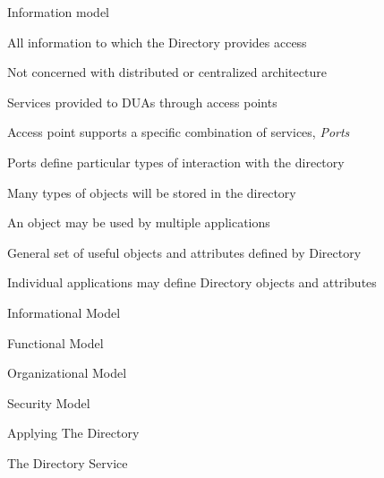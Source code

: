 \begin{bwslide}

\begin{nrtc}
\item	Information model
\item	All information to which the Directory provides access
\item	Not concerned with distributed or centralized architecture
\end{nrtc}
\end{bwslide}

\begin{bwslide}

\begin{nrtc}
\item	Services provided to DUAs through access points
\item	Access point supports a specific combination of services, {\em Ports}
\item	Ports define particular types of interaction with the directory
\end{nrtc}
\end{bwslide}

\begin{bwslide}

\begin{nrtc}
\item	Many types of objects will be stored in the directory
\item	An object may be used by multiple applications
\item	General set of useful objects and attributes defined by Directory
\item	Individual applications may define Directory objects and attributes
\end{nrtc}
\end{bwslide}

\begin{bwslide}

\begin{nrtc}
\item	Informational Model
\item	Functional Model
\item	Organizational Model
\item	Security Model
\item	Applying The Directory
\item	The Directory Service
\end{nrtc}
\end{bwslide}

